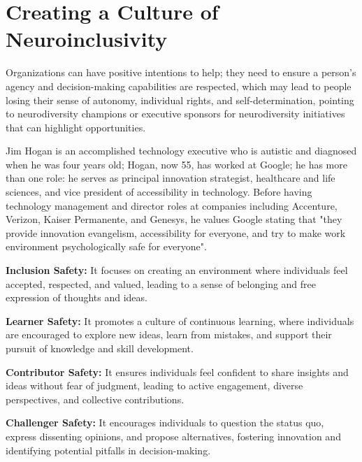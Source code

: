 \documentclass{article}
\begin{document}
\section{Creating a Culture of Neuroinclusivity}

Organizations can have positive intentions to help; they need to ensure a person's agency and decision-making capabilities are respected, which may lead to people losing their sense of autonomy, individual rights, and self-determination, pointing to neurodiversity champions or executive sponsors for neurodiversity initiatives that can highlight opportunities. 

Jim Hogan is an accomplished technology executive who is autistic and diagnosed when he was four years old; Hogan, now 55, has worked at Google; he has more than one role: he serves as principal innovation strategist, healthcare and life sciences, and vice president of accessibility in technology. Before having technology management and director roles at companies including Accenture, Verizon, Kaiser Permanente, and Genesys, he values Google stating that "they provide innovation evangelism, accessibility for everyone, and try to make work environment psychologically safe for everyone". 



    \textbf{Inclusion Safety:}   It focuses on creating an environment where individuals feel accepted, respected, and valued, leading to a sense of belonging and free expression of thoughts and ideas.

     \textbf{Learner Safety:}  It promotes a culture of continuous learning, where individuals are encouraged to explore new ideas, learn from mistakes, and support their pursuit of knowledge and skill development.

     \textbf{Contributor Safety:}  It ensures individuals feel confident to share insights and ideas without fear of judgment, leading to active engagement, diverse perspectives, and collective contributions.

     \textbf{Challenger Safety:} It encourages individuals to question the status quo, express dissenting opinions, and propose alternatives, fostering innovation and identifying potential pitfalls in decision-making.


\newpage
\end{document}

